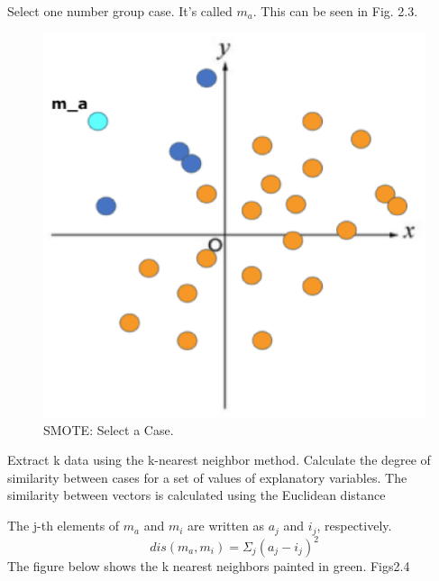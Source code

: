 \clearpage

Select one number group case. It's called $m_a$. This can be seen in Fig. 2.3.

\begin{center}
    \begin{figure}[ht]
        \caption{SMOTE: Select a Case.}
        \label{tab:team-rating-features}
        \begin{center}
            \includegraphics[scale=0.6]{image/smote2.eps}
        \end{center}
    \end{figure}
\end{center}

\clearpage

Extract k data using the k-nearest neighbor method.
Calculate the degree of similarity between cases for a set of values of explanatory variables.
The similarity between vectors is calculated using the Euclidean distance

The j-th elements of $m_a$ and $m_i$ are written as $a_j$ and $i_j$, respectively.
$$
dis(m_a, m_i) = \Sigma_j(a_j - i_j)^2
$$
The figure below shows the k nearest neighbors painted in green. Figs2.4

